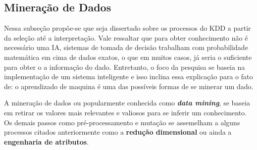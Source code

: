 \subsection{Mineração de Dados}
Nessa subseção propõe-se que seja dissertado sobre os processos do KDD a partir da seleção até a interpretação. Vale ressaltar que para obter conhecimento não é necessário uma IA, sistemas de tomada de decisão trabalham com probabilidade matemática em cima de dados exatos, o que em muitos casos, já seria o suficiente para obter o a informação do dado. Entretanto, o foco da pesquisa se baseia na implementação de um sistema inteligente e isso inclina essa explicação para o fato de: o aprendizado de maquina é uma das possíveis formas de se minerar um dado.

A mineração de dados ou popularmente conhecida como \textbf{\textit{data mining}}, se baseia em retirar os valores mais relevantes e valiosos para se inferir um conhecimento. Os demais passos como pré-processamento e mutação se assemelham a alguns processos citados anteriormente como a \textbf{redução dimensional} ou ainda a \textbf{engenharia de atributos}.

